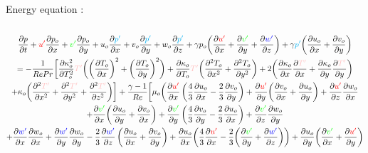 \documentclass[ border=0pt, a4paper, 11pt]{article}
\numberwithin{equation}{section}
\numberwithin{equation}{section}
\renewcommand{\u}{\textcolor{red}{u'}}
\renewcommand{\v}{\textcolor{green}{v'}}
\newcommand{\w}{\textcolor{blue}{w'}}
\newcommand{\p}{\textcolor{cyan}{p'}}
\newcommand{\T}{\textcolor{pink}{T'}}
\begin{document}
Energy equation :
\begin{multline}
 \\\frac{\partial p }{\partial t}
 +\u\frac{\partial p_o }{\partial x}+\v\frac{\partial p_o }{\partial y} +u_o\frac{\partial \p }{\partial x}+v_o\frac{\partial \p }{\partial y}+ w_o\frac{\partial \p }{\partial z} + \gamma p_o\bigg(\frac{\partial \u }{\partial x}+\frac{\partial \v }{\partial y}+\frac{\partial \w }{\partial z}\bigg) +\gamma \p\bigg(\frac{\partial u_o }{\partial x}+\frac{\partial v_o }{\partial y}\bigg)\\
 = -\frac{1}{RePr} \bigg[\frac{\partial  \kappa_o^2 }{\partial T_o^2} \T \bigg(\bigg( \frac{\partial  T_o }{\partial x}\bigg)^2+ \bigg(\frac{\partial T_o}{\partial y}\bigg)^2 \bigg)
+ \frac{\partial  \kappa_o }{\partial T_o} \T\bigg(  \frac{\partial^2 T_o}{\partial x^2} + \frac{\partial^2 T_o}{\partial y^2} \bigg)
 + 2 \bigg(\frac{\partial \kappa_o}{\partial x}\frac{\partial \T }{\partial x}+ \frac{\partial \kappa_o}{\partial y}\frac{\partial \T }{\partial y}\bigg)\\
 +\kappa_o\bigg(\frac{\partial^2 \T }{\partial x^2} +\frac{\partial^2 \T }{\partial y^2} + \frac{\partial^2 \T }{\partial z^2}\bigg)\bigg]
 + \frac{\gamma-1}{Re}\bigg[ \mu_o\bigg( \frac{\partial \u }{\partial x}\left(\frac{4}{3}\frac{\partial u_o}{\partial x}-\frac{2}{3}\frac{\partial v_o}{\partial y}  \right)  + \frac{\partial \u }{\partial y} \bigg(\frac{\partial v_o}{\partial x} + \frac{\partial u_o}{\partial y} \bigg) + \frac{\partial \u }{\partial z} \frac{\partial w_o}{\partial x}\\
 + \frac{\partial \v }{\partial x} \bigg(\frac{\partial u_o}{\partial y} +  \frac{\partial v_o}{\partial x} \bigg) +\frac{\partial \v }{\partial y}\left(\frac{4}{3}\frac{\partial v_o}{\partial y} -\frac{2}{3} \frac{\partial u_o}{\partial x} \right)  + \frac{\partial \v }{\partial z}\frac{\partial w_o}{\partial y}\\
 + \frac{\partial \w }{\partial x} \frac{\partial w_o}{\partial x} + \frac{\partial \w }{\partial y} \frac{\partial w_o}{\partial y} -\frac{2}{3}\frac{\partial \w }{\partial z}\left( \frac{\partial u_o}{\partial x}+\frac{\partial v_o}{\partial y}  \right) 
 +\frac{\partial u_o}{\partial x}\bigg(\frac{4}{3}\frac{\partial \u }{\partial x} -\frac{2}{3} \bigg(\frac{\partial \v }{\partial y} +\frac{\partial \w }{\partial z}\bigg)\bigg) + \frac{\partial u_o}{\partial y} \bigg( \frac{\partial \v }{\partial x} +  \frac{\partial \u }{\partial y} \bigg)\\

\end{multline}
\end{document}
